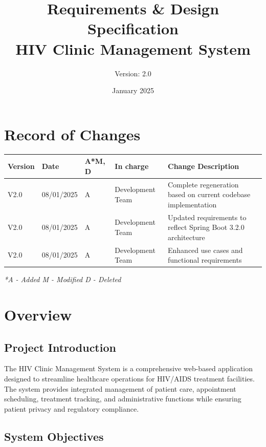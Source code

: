 \documentclass[12pt,a4paper]{article}
\title{\textbf{Requirements \& Design Specification\\HIV Clinic Management System}}
\author{Version: 2.0}
\date{January 2025}
\begin{document}
\maketitle
\thispagestyle{empty}

\newpage

\section*{Record of Changes}

\begin{longtable}{|p{2cm}|p{2cm}|p{1cm}|p{3cm}|p{6cm}|}
\hline
\textbf{Version} & \textbf{Date} & \textbf{A*M, D} & \textbf{In charge} & \textbf{Change Description} \\
\hline
V2.0 & 08/01/2025 & A & Development Team & Complete regeneration based on current codebase implementation \\
\hline
V2.0 & 08/01/2025 & A & Development Team & Updated requirements to reflect Spring Boot 3.2.0 architecture \\
\hline
V2.0 & 08/01/2025 & A & Development Team & Enhanced use cases and functional requirements \\
\hline
\end{longtable}

\textit{*A - Added M - Modified D - Deleted}

\newpage

\tableofcontents

\newpage

\section{Overview}

\subsection{Project Introduction}

The HIV Clinic Management System is a comprehensive web-based application designed to streamline healthcare operations for HIV/AIDS treatment facilities. The system provides integrated management of patient care, appointment scheduling, treatment tracking, and administrative functions while ensuring patient privacy and regulatory compliance.

\subsection{System Objectives}
\end{document}
